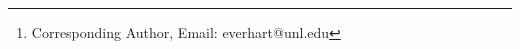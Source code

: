 \usepackage{authblk}
\author[1]{Zhian N. Kamvar}
\author[1]{Sydney E. Everhart\thanks{Corresponding Author, Email: everhart@unl.edu}}
